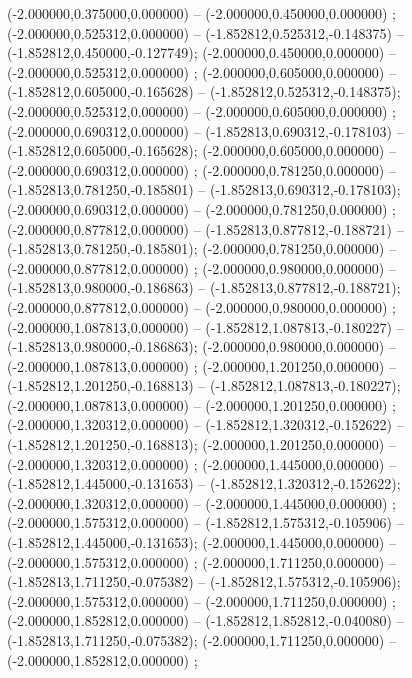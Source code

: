  (-2.000000,0.375000,0.000000) -- (-2.000000,0.450000,0.000000) ;
 (-2.000000,0.525312,0.000000) -- (-1.852812,0.525312,-0.148375) -- (-1.852812,0.450000,-0.127749);
 (-2.000000,0.450000,0.000000) -- (-2.000000,0.525312,0.000000) ;
 (-2.000000,0.605000,0.000000) -- (-1.852812,0.605000,-0.165628) -- (-1.852812,0.525312,-0.148375);
 (-2.000000,0.525312,0.000000) -- (-2.000000,0.605000,0.000000) ;
 (-2.000000,0.690312,0.000000) -- (-1.852813,0.690312,-0.178103) -- (-1.852812,0.605000,-0.165628);
 (-2.000000,0.605000,0.000000) -- (-2.000000,0.690312,0.000000) ;
 (-2.000000,0.781250,0.000000) -- (-1.852813,0.781250,-0.185801) -- (-1.852813,0.690312,-0.178103);
 (-2.000000,0.690312,0.000000) -- (-2.000000,0.781250,0.000000) ;
 (-2.000000,0.877812,0.000000) -- (-1.852813,0.877812,-0.188721) -- (-1.852813,0.781250,-0.185801);
 (-2.000000,0.781250,0.000000) -- (-2.000000,0.877812,0.000000) ;
 (-2.000000,0.980000,0.000000) -- (-1.852813,0.980000,-0.186863) -- (-1.852813,0.877812,-0.188721);
 (-2.000000,0.877812,0.000000) -- (-2.000000,0.980000,0.000000) ;
 (-2.000000,1.087813,0.000000) -- (-1.852812,1.087813,-0.180227) -- (-1.852813,0.980000,-0.186863);
 (-2.000000,0.980000,0.000000) -- (-2.000000,1.087813,0.000000) ;
 (-2.000000,1.201250,0.000000) -- (-1.852812,1.201250,-0.168813) -- (-1.852812,1.087813,-0.180227);
 (-2.000000,1.087813,0.000000) -- (-2.000000,1.201250,0.000000) ;
 (-2.000000,1.320312,0.000000) -- (-1.852812,1.320312,-0.152622) -- (-1.852812,1.201250,-0.168813);
 (-2.000000,1.201250,0.000000) -- (-2.000000,1.320312,0.000000) ;
 (-2.000000,1.445000,0.000000) -- (-1.852812,1.445000,-0.131653) -- (-1.852812,1.320312,-0.152622);
 (-2.000000,1.320312,0.000000) -- (-2.000000,1.445000,0.000000) ;
 (-2.000000,1.575312,0.000000) -- (-1.852812,1.575312,-0.105906) -- (-1.852812,1.445000,-0.131653);
 (-2.000000,1.445000,0.000000) -- (-2.000000,1.575312,0.000000) ;
 (-2.000000,1.711250,0.000000) -- (-1.852813,1.711250,-0.075382) -- (-1.852812,1.575312,-0.105906);
 (-2.000000,1.575312,0.000000) -- (-2.000000,1.711250,0.000000) ;
 (-2.000000,1.852812,0.000000) -- (-1.852812,1.852812,-0.040080) -- (-1.852813,1.711250,-0.075382);
 (-2.000000,1.711250,0.000000) -- (-2.000000,1.852812,0.000000) ;
